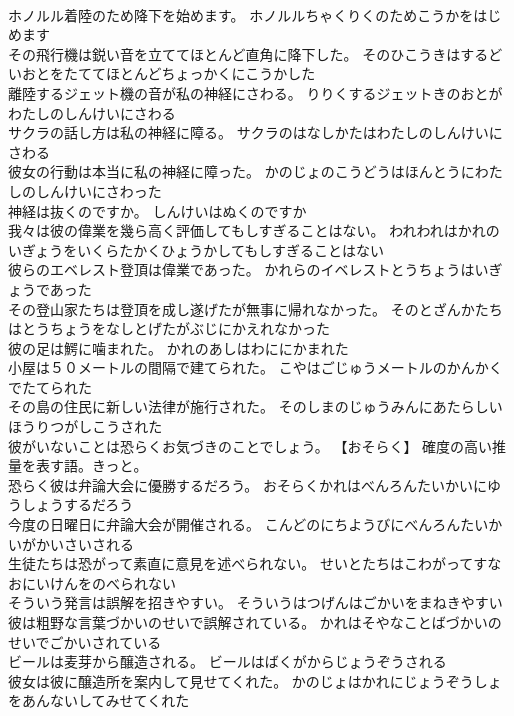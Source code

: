 \documentclass[8pt]{extreport}
\begin{document}
\begin{CJK}{UTF8}{min}
\\	ホノルル着陸のため降下を始めます。	ホノルルちゃくりくのためこうかをはじめます 
\\	その飛行機は鋭い音を立ててほとんど直角に降下した。	そのひこうきはするどいおとをたててほとんどちょっかくにこうかした 
\\	離陸するジェット機の音が私の神経にさわる。	りりくするジェットきのおとがわたしのしんけいにさわる 
\\	サクラの話し方は私の神経に障る。	サクラのはなしかたはわたしのしんけいにさわる 
\\	彼女の行動は本当に私の神経に障った。	かのじょのこうどうはほんとうにわたしのしんけいにさわった 
\\	神経は抜くのですか。	しんけいはぬくのですか 
\\	我々は彼の偉業を幾ら高く評価してもしすぎることはない。	われわれはかれのいぎょうをいくらたかくひょうかしてもしすぎることはない 
\\	彼らのエベレスト登頂は偉業であった。	かれらのイベレストとうちょうはいぎょうであった 
\\	その登山家たちは登頂を成し遂げたが無事に帰れなかった。	そのとざんかたちはとうちょうをなしとげたがぶじにかえれなかった 
\\	彼の足は鰐に噛まれた。	かれのあしはわににかまれた 
\\	小屋は５０メートルの間隔で建てられた。	こやはごじゅうメートルのかんかくでたてられた 
\\	その島の住民に新しい法律が施行された。	そのしまのじゅうみんにあたらしいほうりつがしこうされた 
\\	彼がいないことは恐らくお気づきのことでしょう。	【おそらく】 確度の高い推量を表す語。きっと。
\\	恐らく彼は弁論大会に優勝するだろう。	おそらくかれはべんろんたいかいにゆうしょうするだろう 
\\	今度の日曜日に弁論大会が開催される。	こんどのにちようびにべんろんたいかいがかいさいされる 
\\	生徒たちは恐がって素直に意見を述べられない。	せいとたちはこわがってすなおにいけんをのべられない 
\\	そういう発言は誤解を招きやすい。	そういうはつげんはごかいをまねきやすい 
\\	彼は粗野な言葉づかいのせいで誤解されている。	かれはそやなことばづかいのせいでごかいされている 
\\	ビールは麦芽から醸造される。	ビールはばくがからじょうぞうされる 
\\	彼女は彼に醸造所を案内して見せてくれた。	かのじょはかれにじょうぞうしょをあんないしてみせてくれた 

\end{CJK}
\end{document}
